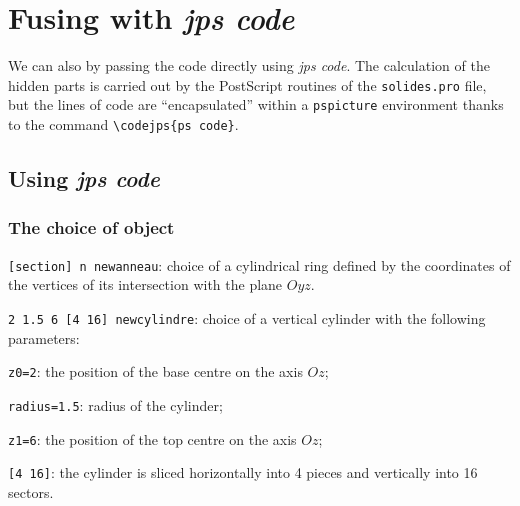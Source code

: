 \def\grille{%
    \psPoint(-5,-5,0){S1}
    \psPoint(-5,5,0){S2}
    \psPoint(5,5,0){S3}
    \psPoint(5,-5,0){S4}
\pspolygon*[linecolor=gray!20](S1)(S2)(S3)(S4)
\multido{\ix=-5+1}{11}{%
    \psPoint(\ix\space,-5,0){A}
    \psPoint(\ix\space,5,0){B}
    \psline(A)(B)}
\multido{\iy=-5+1}{11}{%
    \psPoint(-5,\iy\space,0){A}
    \psPoint(5,\iy\space,0){B}
    \psline(A)(B)}
    \psPoint(0,0,0){O}
    \psPoint(5,0,0){X}
    \psPoint(0,5,0){Y}
    \psPoint(0,0,8){Z}
    \psline[arrowsize=0.3,arrowinset=0.2,linecolor=blue]{->}(O)(X)
    \psline[arrowsize=0.3,arrowinset=0.2,linecolor=blue]{->}(O)(Y)
    \psline[arrowsize=0.3,arrowinset=0.2,linecolor=blue]{->}(O)(Z)
    \uput[r](X){\textcolor{blue}{$x$}}\uput[u](Y){\textcolor{blue}{$y$}}%
    \uput[r](Z){\textcolor{blue}{$z$}}\uput[u](O){\textcolor{blue}{$O$}}}


\section{Fusing with \textit{jps code}}

We can also  by passing the code directly using
\textit{jps code}. The calculation of the hidden parts is carried
out by the PostScript routines of the \texttt{solides.pro} file,
but the lines of code are ``encapsulated'' within a
\texttt{pspicture} environment thanks to the command
\verb+\codejps{ps code}+.

\subsection{Using \textit{jps code}}

\subsubsection{The choice of object}

\begin{compactitem}
  \item \texttt{[section] n newanneau}: choice of a cylindrical ring defined by
  the coordinates of the vertices of its intersection with the plane $Oyz$.
  \item \texttt{2  1.5  6 [4  16]  newcylindre}: choice of a vertical cylinder
with the following parameters:
  \begin{compactitem}
    \item \texttt{z0=2}: the position of the base centre on the axis $Oz$;
    \item \texttt{radius=1.5}: radius of the cylinder;
    \item \texttt{z1=6}: the position of the top centre on the
    axis $Oz$;
    \item \texttt{[4 16]}: the cylinder is sliced horizontally into 4 pieces and
vertically into 16 sectors.
  \end{compactitem}
  \end{compactitem}


